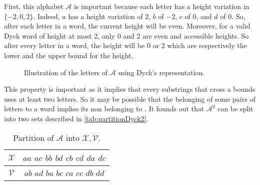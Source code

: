 \begin{tproof}
    First, this alphabet $\mathcal{A}$ is important because each letter
    has a height variation in $\{-2, 0, 2\}$. Indeed, $a$ has a height
    variation of 2, $b$ of $-2$, $c$ of 0, and $d$ of 0.
    So, after each letter in a word, the current height will be even.
    Moreover, for a valid Dyck word of height at most 2, only 0 and 2
    are even and accessible heights. So after every
    letter in a word, the height will be 0 or 2 which are respectively
    the lower and the upper bound for the height.

    \begin{figure}[h!]
        \centering
        \caption{Illustration of the letters of $\mathcal{A}$ using Dyck's representation.}
        \label{tikz:dyck2alphabet}
    \end{figure}

    This property is important as it implies that every substrings that cross a
    bounds uses at least two letters. So it may be possible that the belonging
    of some pairs of letters to a word implies its non belonging to .
    It founds out that $\mathcal{A}^2$ can be split into two sets described
    in \autoref{tab:partitionDyck2}.

    \begin{table}[htb]
        \centering
        \caption{Partition of $\mathcal{A}$ into $\mathcal{X}, \mathcal{V}$.}
        \label{tab:partitionDyck2}
        \begin{tabular}{|c|c|}
            \hline
            $\mathcal{X}$ & $aa$ $ac$ $bb$ $bd$ $cb$ $cd$ $da$ $dc$ \\
            \hline
            $\mathcal{V}$ & $ab$ $ad$ $ba$ $bc$ $ca$ $cc$ $db$ $dd$ \\
            \hline
        \end{tabular}



\end{table}
\end{tproof}
